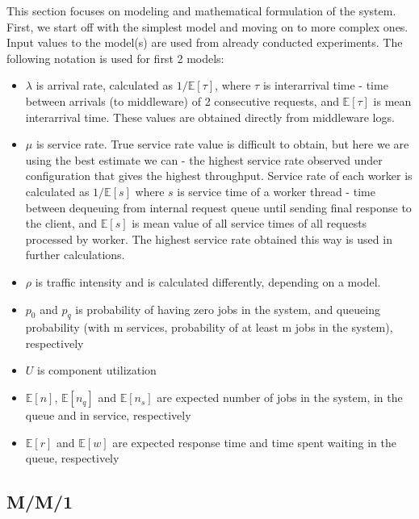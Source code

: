 \documentclass[11pt,a4paper]{article}
\begin{document}
This section focuses on modeling and mathematical formulation of the system. First, we start off with the simplest model and moving on to more complex ones. Input values to the model(s) are used from already conducted experiments. The following notation is used for first 2 models:
\begin{itemize}
	\item $\lambda$ is arrival rate, calculated as $1/\mathbb{E}[\tau]$, where $\tau$ is interarrival time - time between arrivals (to middleware) of 2 consecutive requests, and $\mathbb{E}[\tau]$ is mean interarrival time. These values are obtained directly from middleware logs.
	\item $\mu$ is service rate. True service rate value is difficult to obtain, but here we are using the best estimate we can - the highest service rate observed under configuration that gives the highest throughput. Service rate of each worker is calculated as $1/\mathbb{E}[s]$ where $s$ is service time of a worker thread - time between dequeuing from internal request queue until sending final response to the client, and $\mathbb{E}[s]$ is mean value of all service times of all requests processed by worker. The highest service rate obtained this way is used in further calculations.
	\item $\rho$ is traffic intensity and is calculated differently, depending on a model.
	\item $p_0$ and $p_q$ is probability of having zero jobs in the system, and queueing probability (with m services, probability of at least m jobs in the system), respectively
	\item $U$ is component utilization
	\item $\mathbb{E}[n]$, $\mathbb{E}[n_q]$ and $\mathbb{E}[n_s]$ are expected number of jobs in the system, in the queue and in service, respectively
	\item $\mathbb{E}[r]$ and $\mathbb{E}[w]$ are expected response time and time spent waiting in the queue, respectively
\end{itemize} 

\subsection{M/M/1}
\end{document}
